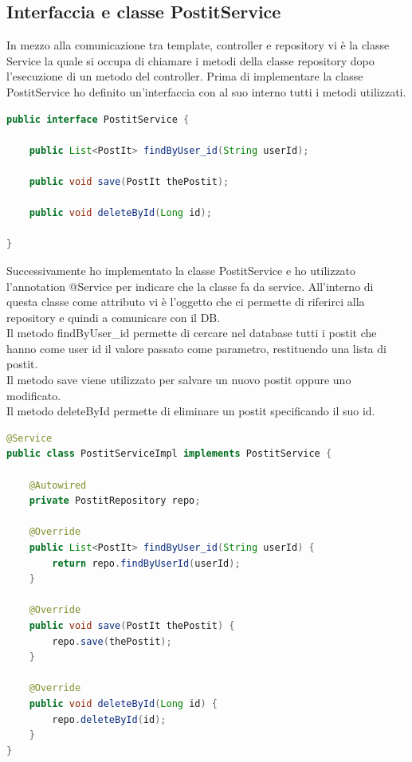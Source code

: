 \subsection{Interfaccia e classe PostitService}
In mezzo alla comunicazione tra template, controller e repository vi è la classe Service la quale si occupa di chiamare i metodi della classe repository dopo l'esecuzione di un metodo del controller.
Prima di implementare la classe PostitService ho definito un'interfaccia con al suo interno tutti i metodi utilizzati.\\
\begin{lstlisting}[language=Java,basicstyle=\small, caption={Interfaccia PostitService.java}, captionpos=b]
public interface PostitService {

    public List<PostIt> findByUser_id(String userId);
    
    public void save(PostIt thePostit);
    
    public void deleteById(Long id);

}
\end{lstlisting}
Successivamente ho implementato la classe PostitService e ho utilizzato l'annotation @Service per indicare che la classe fa da service.
All'interno di questa classe come attributo vi è l'oggetto che ci permette di riferirci alla repository e quindi a comunicare con il DB.\\
Il metodo findByUser\_id permette di cercare nel database tutti i postit che hanno come user id il valore passato come parametro, restituendo una lista di postit.\\
Il metodo save viene utilizzato per salvare un nuovo postit oppure uno modificato.\\
Il metodo deleteById permette di eliminare un postit specificando il suo id.
\begin{lstlisting}[language=Java,basicstyle=\small, caption={Classe PostitServiceImpl.java}, captionpos=b]
@Service
public class PostitServiceImpl implements PostitService {

    @Autowired
    private PostitRepository repo;

    @Override
    public List<PostIt> findByUser_id(String userId) {
        return repo.findByUserId(userId);
    }

    @Override
    public void save(PostIt thePostit) {
        repo.save(thePostit);
    }

    @Override
    public void deleteById(Long id) {
        repo.deleteById(id);
    }
}
\end{lstlisting}
\newpage
